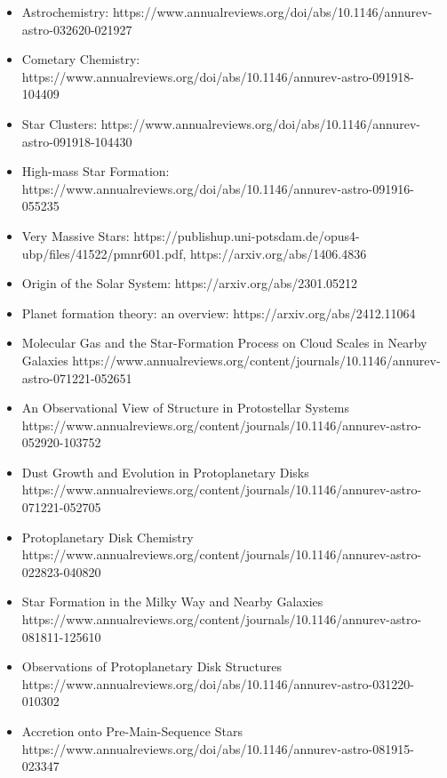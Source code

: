 \documentclass{article}
\begin{document}
\begin{itemize}
    \item Astrochemistry: https://www.annualreviews.org/doi/abs/10.1146/annurev-astro-032620-021927
    \item Cometary Chemistry: https://www.annualreviews.org/doi/abs/10.1146/annurev-astro-091918-104409
    \item Star Clusters: https://www.annualreviews.org/doi/abs/10.1146/annurev-astro-091918-104430
    \item High-mass Star Formation: https://www.annualreviews.org/doi/abs/10.1146/annurev-astro-091916-055235
    \item Very Massive Stars: https://publishup.uni-potsdam.de/opus4-ubp/files/41522/pmnr601.pdf,  https://arxiv.org/abs/1406.4836
    \item Origin of the Solar System: https://arxiv.org/abs/2301.05212
    \item Planet formation theory: an overview: https://arxiv.org/abs/2412.11064
    \item Molecular Gas and the Star-Formation Process on Cloud Scales in Nearby Galaxies
    https://www.annualreviews.org/content/journals/10.1146/annurev-astro-071221-052651
    \item An Observational View of Structure in Protostellar Systems
     https://www.annualreviews.org/content/journals/10.1146/annurev-astro-052920-103752
     \item Dust Growth and Evolution in Protoplanetary Disks
     https://www.annualreviews.org/content/journals/10.1146/annurev-astro-071221-052705
     \item Protoplanetary Disk Chemistry
     https://www.annualreviews.org/content/journals/10.1146/annurev-astro-022823-040820
\item Star Formation in the Milky Way and Nearby Galaxies
 https://www.annualreviews.org/content/journals/10.1146/annurev-astro-081811-125610
    \item Observations of Protoplanetary Disk Structures  https://www.annualreviews.org/doi/abs/10.1146/annurev-astro-031220-010302
    \item Accretion onto Pre-Main-Sequence Stars https://www.annualreviews.org/doi/abs/10.1146/annurev-astro-081915-023347
\end{itemize}
\end{document}
